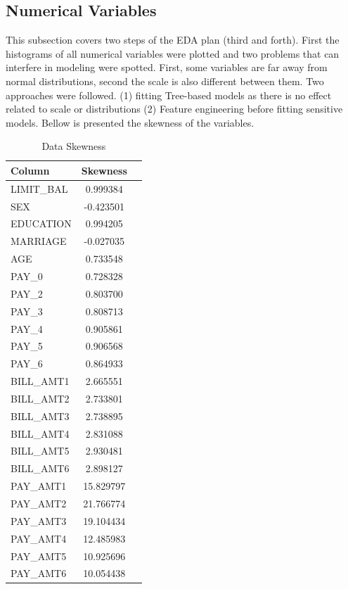 \documentclass[11pt, a4]{article}
\begin{document}
\subsection*{Numerical Variables}

This subsection covers two steps of the EDA plan (third and forth). First the histograms of all numerical variables were plotted and two problems that can interfere in modeling were spotted. First, some variables are far away from normal distributions, second the scale is also different between them. Two approaches were followed. (1) fitting Tree-based models as there is no effect related to scale or distributions (2) Feature engineering before fitting sensitive models. Bellow is presented the skewness of the variables.

\begin{table}[h!]
\centering
\begin{tabular}{l c c}
\toprule
\textbf{Column} & \textbf{Skewness} \\
\midrule
LIMIT_BAL    & 0.999384\\
SEX          & -0.423501\\
EDUCATION    & 0.994205\\
MARRIAGE     &-0.027035\\
AGE          & 0.733548\\
PAY_0         & 0.728328\\
PAY_2       &  0.803700\\
PAY_3        & 0.808713\\
PAY_4        & 0.905861\\
PAY_5        & 0.906568\\
PAY_6         &0.864933\\
BILL_AMT1     &2.665551\\
BILL_AMT2    & 2.733801\\
BILL_AMT3    & 2.738895\\
BILL_AMT4    & 2.831088\\
BILL_AMT5    & 2.930481\\
BILL_AMT6    & 2.898127\\
PAY_AMT1    & 15.829797\\
PAY_AMT2    & 21.766774\\
PAY_AMT3    & 19.104434\\
PAY_AMT4    & 12.485983\\
PAY_AMT5    & 10.925696\\
PAY_AMT6    & 10.054438\\
\bottomrule
\end{tabular}
\caption{Data Skewness}
\label{table:3}
\end{table}
\end{document}
